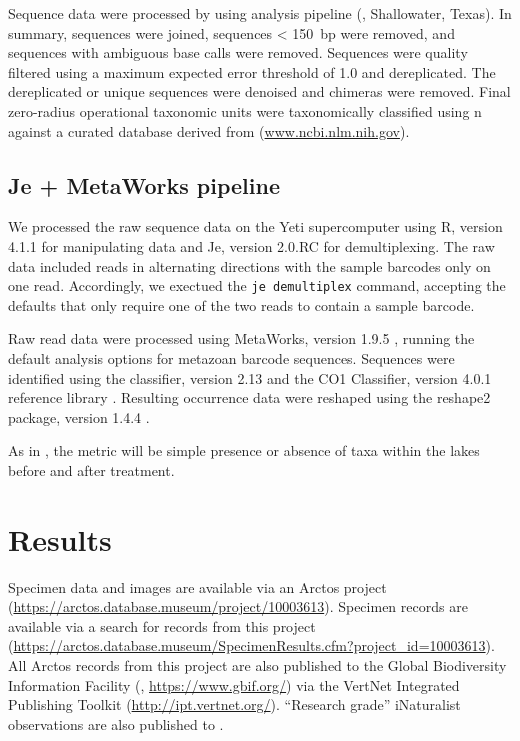 \begin{multicols}{2}
Sequence data were processed by using  analysis pipeline (, Shallowater, Texas).  In summary, sequences were joined, sequences < 150~bp were removed, and sequences with ambiguous base calls were removed. Sequences were quality filtered using a maximum expected error threshold of 1.0 and dereplicated. The dereplicated or unique sequences were denoised and chimeras were removed. Final zero-radius operational taxonomic units were taxonomically classified using n against a curated database derived from  (\url{www.ncbi.nlm.nih.gov}).   

\subsection{Je + MetaWorks pipeline}

We processed the raw sequence data on the  Yeti supercomputer \citep{USGSARC2021} using R, version 4.1.1 for manipulating data and Je, version 2.0.RC \citep{Girardotetal2016} for demultiplexing. The raw data included reads in alternating directions with the sample barcodes only on one read. Accordingly, we exectued the \verb|je demultiplex| command, accepting the defaults that only require one of the two reads to contain a sample barcode.

Raw read data were processed using MetaWorks, version 1.9.5 \citep{PorterHajibabaei2020}, running the default analysis options for metazoan   barcode sequences. Sequences were identified using the  classifier, version 2.13 \citep{Wangetal2007} and the CO1 Classifier, version 4.0.1 reference library \citep{Porter2017, PorterHajibabaei2018}. Resulting occurrence data were reshaped using the reshape2 package, version 1.4.4 \citep{Wickham2007}.

As in \citet{Massengill2014, Massengill2017}, the metric will be simple presence or absence of taxa within the lakes before and after treatment.

\section{Results}

Specimen data and images are available via an Arctos project (\url{https://arctos.database.museum/project/10003613}). Specimen records are available via a search for records from this project (\url{https://arctos.database.museum/SpecimenResults.cfm?project_id=10003613}). All Arctos records from this project are also published to the Global Biodiversity Information Facility (, \url{https://www.gbif.org/}) via the VertNet Integrated Publishing Toolkit (\url{http://ipt.vertnet.org/}). ``Research grade'' iNaturalist observations are also published to .


\end{multicols}
